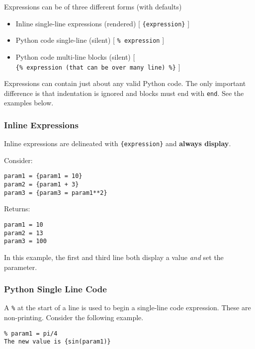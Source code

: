 Expressions can be of three different forms (with defaults)

\begin{itemize}
\tightlist
\item
  Inline single-line expressions (rendered) {[} \texttt{\{expression\}}
  {]}
\item
  Python code single-line (silent) {[} \texttt{\%\ expression} {]}
\item
  Python code multi-line blocks (silent) {[}
  \texttt{\{\%\ expression\ (that\ can\ be\ over\ many\ line)\ \%\}} {]}
\end{itemize}

Expressions can contain just about any valid Python code. The only
important difference is that indentation is ignored and blocks must end 
with \texttt{end}. See the examples below.

\subsubsection{Inline Expressions}\label{interfaces:inline-expressions}

Inline expressions are delineated with \texttt{\{expression\}} and
\textbf{always display}.

Consider:

\begin{verbatim}
param1 = {param1 = 10}
param2 = {param1 + 3}
param3 = {param3 = param1**2}
\end{verbatim}

Returns:

\begin{verbatim}
param1 = 10
param2 = 13
param3 = 100
\end{verbatim}

In this example, the first and third line both display a value
\emph{and} set the parameter.

\subsubsection{Python Single Line Code}\label{interfaces:python-single-line-code}

A \texttt{\%} at the start of a line is used to begin a single-line code expression.
These are non-printing.
Consider the following example.

\begin{verbatim}
% param1 = pi/4
The new value is {sin(param1)}
\end{verbatim}

